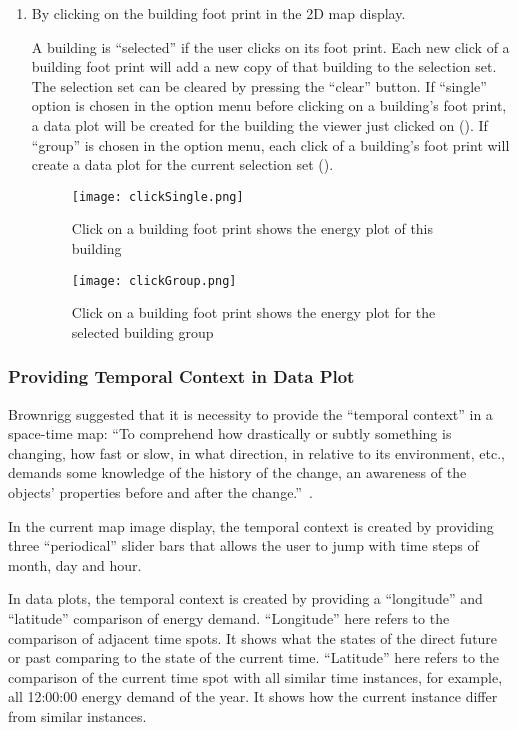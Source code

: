 \begin{enumerate}[1)]
\item By clicking on the building foot print in the 2D map display.

  A building is ``selected'' if the user clicks on its foot
  print. Each new click of a building foot print will add a new copy
  of that building to the selection set. The selection set can be
  cleared by pressing the ``clear'' button. If ``single'' option is
  chosen in the option menu before clicking on a building's foot
  print, a data plot will be created for the building the viewer just
  clicked on (). If ``group'' is chosen in the
  option menu, each click of a building's foot print will create a
  data plot for the current selection set ().
  
  \begin{figure}[h!]
    \centering
    \texttt{[image: clickSingle.png]}
    \caption[Show Plot for One Building]{Click on a building foot
      print shows the energy plot of this building}
    \label{fig:clickSingle}
  \end{figure}

  \begin{figure}[h!]
    \centering
    \texttt{[image: clickGroup.png]}
    \caption[Show Plot for a Group of Buildings]{Click on a building
      foot print shows the energy plot for the selected building group}
    \label{fig:clickGroup}
  \end{figure}

\end{enumerate}

\subsubsection{Providing Temporal Context in Data Plot}

Brownrigg suggested that it is necessity to provide the ``temporal
context'' in a space-time map: ``To comprehend how drastically or
subtly something is changing, how fast or slow, in what direction, in
relative to its environment, etc., demands some knowledge of the
history of the change, an awareness of the objects' properties before
and after the change.''~\cite{Brownrigg2005}.

In the current map image display, the temporal context is created by
providing three ``periodical'' slider bars that allows the user to
jump with time steps of month, day and hour. 

In data plots, the temporal context is created by providing a
``longitude'' and ``latitude'' comparison of energy demand.
``Longitude'' here refers to the comparison of adjacent time spots. It
shows what the states of the direct future or past comparing to the
state of the current time. ``Latitude'' here refers to the comparison
of the current time spot with all similar time instances, for example,
all 12:00:00 energy demand of the year. It shows how the current
instance differ from similar instances.


